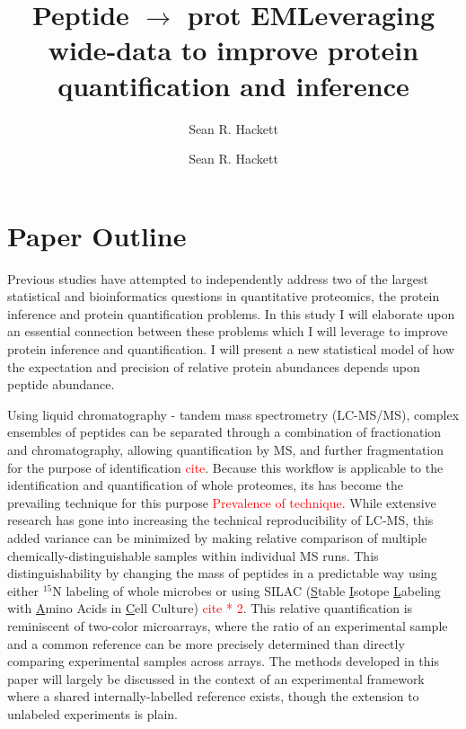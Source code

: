 \documentclass[12pt]{article}
\author{Sean R. Hackett}
\title{Peptide $\rightarrow$ prot EM}
\date{}
\begin{document}
\setlength{\parskip}{2mm}
\linespread{1}

\thispagestyle{empty}
\pagestyle{empty}

\title{Leveraging wide-data to improve protein quantification and
inference}
\author{Sean R. Hackett}


\maketitle


\section*{Paper Outline}

Previous studies have attempted to independently address two of the largest statistical and bioinformatics questions in quantitative proteomics, the protein inference and protein quantification problems. In this study I will elaborate upon an essential connection between these problems which I will leverage to improve protein inference and quantification. I will present a new statistical model of how the expectation and precision of relative protein abundances depends upon peptide abundance.

Using liquid chromatography - tandem mass spectrometry (LC-MS/MS), complex ensembles of peptides can be separated through a combination of fractionation and chromatography, allowing quantification by MS, and further fragmentation for the purpose of identification \textcolor{red}{cite}. Because this workflow is applicable to the identification and quantification of whole proteomes, its has become the prevailing technique for this purpose \textcolor{red}{Prevalence of technique}. While extensive research has gone into increasing the technical reproducibility of LC-MS, this added variance can be minimized by making relative comparison of multiple chemically-distinguishable samples within individual MS runs. This distinguishability by changing the mass of peptides in a predictable way using either $^{15}$N labeling of whole microbes or using SILAC (\underline{S}table \underline{I}sotope \underline{L}abeling with \underline{A}mino Acids in \underline{C}ell Culture) \textcolor{red}{cite * 2}. This relative quantification is reminiscent of two-color microarrays, where the ratio of an experimental sample and a common reference can be more precisely determined than directly comparing experimental samples across arrays. The methods developed in this paper will largely be discussed in the context of an experimental framework where a shared internally-labelled reference exists, though the extension to unlabeled experiments is plain.
\end{document}
